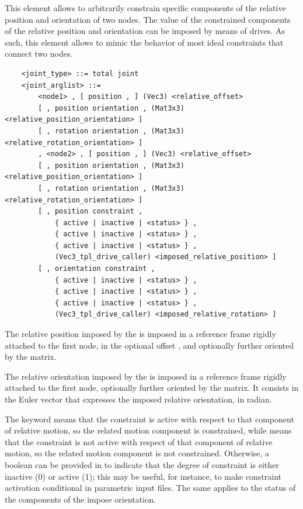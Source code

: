 This element allows to arbitrarily constrain specific components
of the relative position and orientation of two nodes.
The value of the constrained components of the relative position
and orientation can be imposed by means of drives.
As such, this element allows to mimic the behavior of most
ideal constraints that connect two nodes.
\begin{verbatim}
    <joint_type> ::= total joint
    <joint_arglist> ::=
        <node1> , [ position , ] (Vec3) <relative_offset>
        [ , position orientation , (Mat3x3) <relative_position_orientation> ]
        [ , rotation orientation , (Mat3x3) <relative_rotation_orientation> ]
        , <node2> , [ position , ] (Vec3) <relative_offset>
        [ , position orientation , (Mat3x3) <relative_position_orientation> ]
        [ , rotation orientation , (Mat3x3) <relative_rotation_orientation> ]
        [ , position constraint ,
            { active | inactive | <status> } ,
            { active | inactive | <status> } ,
            { active | inactive | <status> } ,
            (Vec3_tpl_drive_caller) <imposed_relative_position> ]
        [ , orientation constraint ,
            { active | inactive | <status> } ,
            { active | inactive | <status> } ,
            { active | inactive | <status> } ,
            (Vec3_tpl_drive_caller) <imposed_relative_rotation> ]
\end{verbatim}
The relative position imposed by the 
is imposed in a reference frame rigidly attached to the first node,
in the optional offset ,
and optionally further oriented by the 
matrix.

The relative orientation imposed by the 
is imposed in a reference frame rigidly attached to the first node,
optionally further oriented by the 
matrix.
It consists in the Euler vector that expresses
the imposed relative orientation, in radian.

The keyword  means that the constraint is active
with respect to that component of relative motion,
so the related motion component is constrained,
while  means that the constraint is not active
with respect of that component of relative motion,
so the related motion component is not constrained.
Otherwise, a boolean can be provided in  to indicate
that the degree of constraint is either inactive (0) or active (1);
this may be useful, for instance, to make constraint activation
conditional in parametric input files.
The same applies to the status of the components of the impose orientation.


